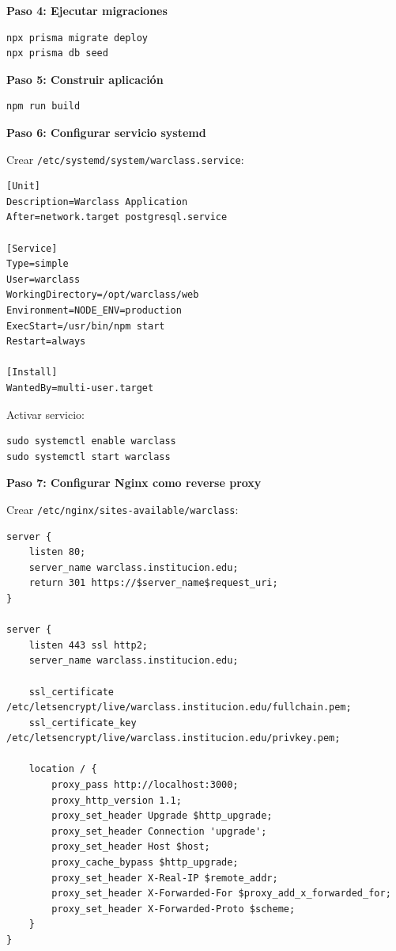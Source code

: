 \textbf{Paso 4: Ejecutar migraciones}

\begin{verbatim}
npx prisma migrate deploy
npx prisma db seed
\end{verbatim}

\textbf{Paso 5: Construir aplicación}

\begin{verbatim}
npm run build
\end{verbatim}

\textbf{Paso 6: Configurar servicio systemd}

Crear \texttt{/etc/systemd/system/warclass.service}:

\begin{verbatim}
[Unit]
Description=Warclass Application
After=network.target postgresql.service

[Service]
Type=simple
User=warclass
WorkingDirectory=/opt/warclass/web
Environment=NODE_ENV=production
ExecStart=/usr/bin/npm start
Restart=always

[Install]
WantedBy=multi-user.target
\end{verbatim}

Activar servicio:

\begin{verbatim}
sudo systemctl enable warclass
sudo systemctl start warclass
\end{verbatim}

\textbf{Paso 7: Configurar Nginx como reverse proxy}

Crear \texttt{/etc/nginx/sites-available/warclass}:

\begin{verbatim}
server {
    listen 80;
    server_name warclass.institucion.edu;
    return 301 https://$server_name$request_uri;
}

server {
    listen 443 ssl http2;
    server_name warclass.institucion.edu;

    ssl_certificate /etc/letsencrypt/live/warclass.institucion.edu/fullchain.pem;
    ssl_certificate_key /etc/letsencrypt/live/warclass.institucion.edu/privkey.pem;

    location / {
        proxy_pass http://localhost:3000;
        proxy_http_version 1.1;
        proxy_set_header Upgrade $http_upgrade;
        proxy_set_header Connection 'upgrade';
        proxy_set_header Host $host;
        proxy_cache_bypass $http_upgrade;
        proxy_set_header X-Real-IP $remote_addr;
        proxy_set_header X-Forwarded-For $proxy_add_x_forwarded_for;
        proxy_set_header X-Forwarded-Proto $scheme;
    }
}
\end{verbatim}

